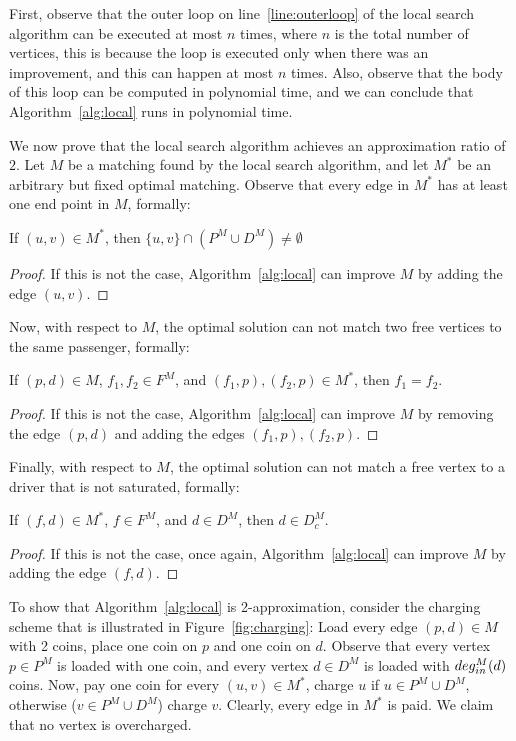 First, observe that the outer loop on line~\ref{line:outerloop} of the local search algorithm
can be executed at most $n$ times, 
where $n$ is the total number of vertices, 
this is because the loop is executed only when there was an improvement, 
and this can happen at most $n$ times.
Also, observe that the body of this loop can be computed in polynomial time, 
and we can conclude that Algorithm~\ref{alg:local} runs in polynomial time.
    
We now prove that the local search algorithm achieves an approximation ratio of $2$.
Let $M$ be a matching found by the local search algorithm, 
and let $M^*$ be an arbitrary but fixed optimal matching.
Observe that every edge in $M^*$ has at least one end point in $M$, formally: 
\begin{lemma}
If $(u,v) \in M^*$, then $\{u,v\} \cap (P^M \cup D^M) \neq \emptyset$
\end{lemma}

\begin{proof}
If this is not the case, Algorithm~\ref{alg:local} can improve $M$
by adding the edge $(u,v)$.  
\end{proof}

Now, with respect to $M$, the optimal solution can not match two free vertices to the same
passenger, formally:
\begin{lemma}
\label{lemma:one-free}
If $(p,d) \in M$, $f_1, f_2 \in F^M$, and $(f_1, p), (f_2, p) \in M^*$, then $f_1 = f_2$.
\end{lemma}

\begin{proof}
If this is not the case, Algorithm~\ref{alg:local} can improve $M$ 
by removing the edge $(p,d)$ and adding the edges $(f_1, p), (f_2, p)$.
\end{proof}

Finally, with respect to $M$, the optimal solution can not match a free vertex to a driver
that is not saturated, formally: 
\begin{lemma}
\label{lemma:saturated}
If $(f,d) \in M^*$, $f \in F^M$, and $d \in D^M$, then $d \in D^M_c$.
\end{lemma}

\begin{proof}
If this is not the case, once again, Algorithm~\ref{alg:local} can improve $M$
by adding the edge $(f,d)$.
\end{proof}

To show that Algorithm~\ref{alg:local} is 2-approximation, 
consider the charging scheme that is illustrated in Figure~\ref{fig:charging}:
Load every edge $(p,d) \in M$ with 2 coins, 
place one coin on $p$ and one coin on $d$.
Observe that every vertex $p \in P^M$ is loaded with one coin, 
and every vertex $d \in D^M$ is loaded with $deg^M_{in}(d)$ coins.   
Now, pay one coin for every $(u,v) \in M^*$, charge $u$ if $u \in P^M \cup D^M$, 
otherwise ($v \in P^M \cup D^M$) charge $v$.
Clearly, every edge in $M^*$ is paid.
We claim that no vertex is overcharged.

